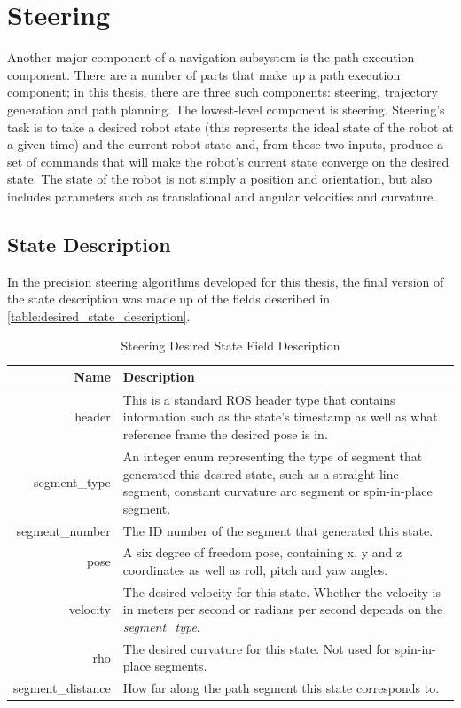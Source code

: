 \section{Steering}\label{sec:steering}

Another major component of a navigation subsystem is the path execution component. There are a number of parts that make up a path execution component; in this thesis, there are three such components: steering, trajectory generation and path planning. The lowest-level component is steering. Steering's task is to take a desired robot state (this represents the ideal state of the robot at a given time) and the current robot state and, from those two inputs, produce a set of commands that will make the robot's current state converge on the desired state. The state of the robot is not simply a position and orientation, but also includes parameters such as translational and angular velocities and curvature.

\subsection{State Description}\label{subsec:steering_state}

In the precision steering algorithms developed for this thesis, the final version of the state description was made up of the fields described in \autoref{table:desired_state_description}.

\begin{table}[htbp]
	\begin{tabularx}{\textwidth}{|r|X|}
		\hline
		Name & Description \\
		\hline
		header & This is a standard ROS header type that contains information such as the state's timestamp as well as what reference frame the desired pose is in. \\
		\hline
		segment\_type & An integer enum representing the type of segment that generated this desired state, such as a straight line segment, constant curvature arc segment or spin-in-place segment. \\
		\hline
		segment\_number & The ID number of the segment that generated this state. \\
		\hline
		pose & A six degree of freedom pose, containing x, y and z coordinates as well as roll, pitch and yaw angles. \\
		\hline
		velocity & The desired velocity for this state. Whether the velocity is in meters per second or radians per second depends on the \emph{segment\_type}. \\
		\hline
		rho & The desired curvature for this state. Not used for spin-in-place segments. \\
		\hline
		segment\_distance & How far along the path segment this state corresponds to. \\
		\hline
	\end{tabularx}
	\caption{Steering Desired State Field Description \label{table:desired_state_description}}
\end{table}

